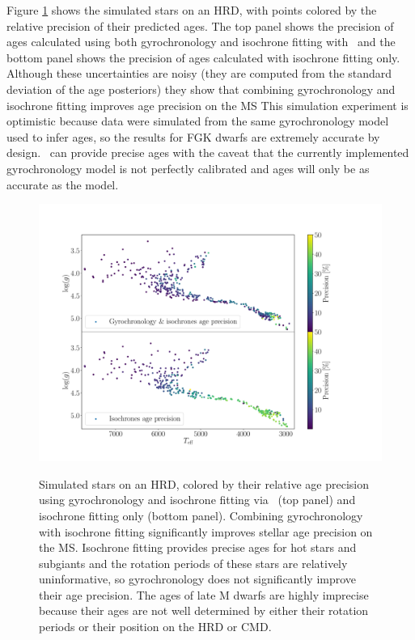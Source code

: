 Figure \ref{fig:precision} shows the simulated stars on an HRD, with
points colored by the relative precision of their predicted ages.
The top panel shows the precision of ages calculated using both gyrochronology
and isochrone fitting with \sd\ and the bottom panel shows the precision of
ages calculated with isochrone fitting only.
Although these uncertainties are noisy (they are computed from the standard
deviation of the age posteriors) they show that combining gyrochronology and
isochrone fitting improves age precision on the MS
This simulation experiment is optimistic because data were simulated from the
same gyrochronology model used to infer ages, so the results for FGK dwarfs
are extremely accurate by design.
\sd\ can provide precise ages with the caveat that the currently implemented
gyrochronology model is not perfectly calibrated and ages will only be as
accurate as the model.
\begin{figure}
  \caption{
Simulated stars on an HRD, colored by their relative age precision
    using gyrochronology and isochrone fitting via \sd\ (top panel) and
    isochrone fitting only (bottom panel).
Combining gyrochronology with isochrone fitting significantly improves stellar
    age precision on the MS.
Isochrone fitting provides precise ages for hot stars and subgiants and the
    rotation periods of these stars are relatively uninformative, so
    gyrochronology does not significantly improve their age precision.
The ages of late M dwarfs are highly imprecise because their ages are not well
    determined by either their rotation periods or their position on the HRD
    or CMD.
}
  \centering
    \includegraphics[width=1\textwidth]{precision_plot}
\label{fig:precision}
\end{figure}

